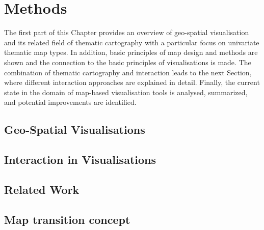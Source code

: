\section{Methods}
\label{s:methods}
The first part of this Chapter provides an overview of geo-spatial visualisation and its related field of thematic cartography with a particular focus on univariate thematic map types. In addition, basic principles of map design and methods are shown and the connection to the basic principles of visualisations is made.
The combination of thematic cartography and interaction leads to the next Section, where different interaction approaches are explained in detail. Finally, the current state in the domain of map-based visualisation tools is analysed, summarized, and potential improvements are identified.

\subsection{Geo-Spatial Visualisations}
\label{s:cartography}


% 

\subsection{Interaction in Visualisations}
\label{s:interaction}


\subsection{Related Work}


\subsection{Map transition concept}
\label{s:theoretical-contrib}
